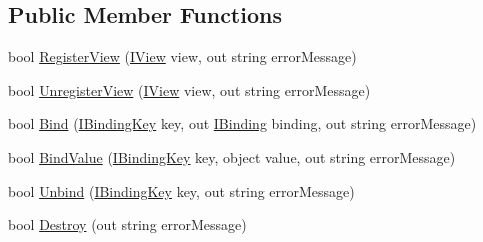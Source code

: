 \subsection*{Public Member Functions}
\begin{DoxyCompactItemize}
\item 
bool \mbox{\hyperlink{interfacecp_games_1_1core_1_1_rapid_m_v_c_1_1_i_context_a975a12d7037f6425755b27feeeafb155}{Register\+View}} (\mbox{\hyperlink{interfacecp_games_1_1core_1_1_rapid_m_v_c_1_1_i_view}{I\+View}} view, out string error\+Message)
\item 
bool \mbox{\hyperlink{interfacecp_games_1_1core_1_1_rapid_m_v_c_1_1_i_context_a86f05401110f08cbc79a83fd4366d505}{Unregister\+View}} (\mbox{\hyperlink{interfacecp_games_1_1core_1_1_rapid_m_v_c_1_1_i_view}{I\+View}} view, out string error\+Message)
\item 
bool \mbox{\hyperlink{interfacecp_games_1_1core_1_1_rapid_m_v_c_1_1_i_context_a5f24672bfe61416bdc05a8e68eb147d0}{Bind}} (\mbox{\hyperlink{interfacecp_games_1_1core_1_1_rapid_m_v_c_1_1_i_binding_key}{I\+Binding\+Key}} key, out \mbox{\hyperlink{interfacecp_games_1_1core_1_1_rapid_m_v_c_1_1_i_binding}{I\+Binding}} binding, out string error\+Message)
\item 
bool \mbox{\hyperlink{interfacecp_games_1_1core_1_1_rapid_m_v_c_1_1_i_context_abd1373878fbfe20526c96a476e939e9e}{Bind\+Value}} (\mbox{\hyperlink{interfacecp_games_1_1core_1_1_rapid_m_v_c_1_1_i_binding_key}{I\+Binding\+Key}} key, object value, out string error\+Message)
\item 
bool \mbox{\hyperlink{interfacecp_games_1_1core_1_1_rapid_m_v_c_1_1_i_context_abfff82911155824da32f84d8647d9e56}{Unbind}} (\mbox{\hyperlink{interfacecp_games_1_1core_1_1_rapid_m_v_c_1_1_i_binding_key}{I\+Binding\+Key}} key, out string error\+Message)
\item 
bool \mbox{\hyperlink{interfacecp_games_1_1core_1_1_rapid_m_v_c_1_1_i_context_acf8d52b810d6b088bf1999ea980c7705}{Destroy}} (out string error\+Message)
\end{DoxyCompactItemize}
